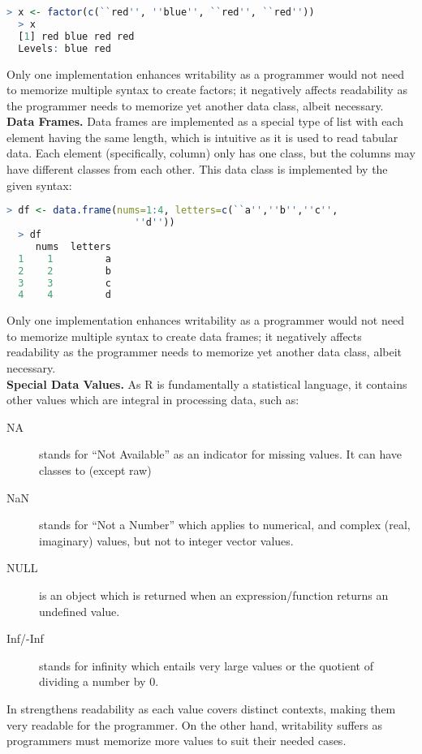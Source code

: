 \documentclass[12pt]{article}
\begin{document}
\begin{lstlisting}[language=R]
  > x <- factor(c(``red'', ''blue'', ``red'', ``red''))
  > x
  [1] red blue red red
  Levels: blue red
\end{lstlisting}

Only one implementation enhances writability as a programmer would not need to memorize multiple syntax to create factors; it negatively affects readability as the programmer needs to memorize yet another data class, albeit necessary.\\

\textbf{Data Frames.} Data frames are implemented as a special type of list with each element having the same length, which is intuitive as it is used to read tabular data. Each element (specifically, column) only has one class, but the columns may have different classes from each other. This data class is implemented by the given syntax:

\begin{lstlisting}[language=R]
  > df <- data.frame(nums=1:4, letters=c(``a'',''b'',''c'',
                      ''d''))
  > df
     nums  letters
  1    1         a
  2    2         b
  3    3         c
  4    4         d
\end{lstlisting}

Only one implementation enhances writability as a programmer would not need to memorize multiple syntax to create data frames; it negatively affects readability as the programmer needs to memorize yet another data class, albeit necessary.\\

\textbf{Special Data Values.} As R is fundamentally a statistical language, it contains other values which are integral in processing data, such as:
\begin{description}
\item[NA] stands for ``Not Available'' as an indicator for missing values. It can have classes to (except raw)
\item[NaN] stands for ``Not a Number'' which applies to numerical, and complex (real, imaginary) values, but not to integer vector values.
\item[NULL] is an object which is returned when an expression/function returns an undefined value.
\item[Inf/-Inf] stands for infinity which entails very large values or the quotient of dividing a number by 0.
\end{description}

In strengthens readability as each value covers distinct contexts, making them very readable for the programmer. On the other hand, writability suffers as programmers must memorize more values to suit their needed cases.
\end{document}

